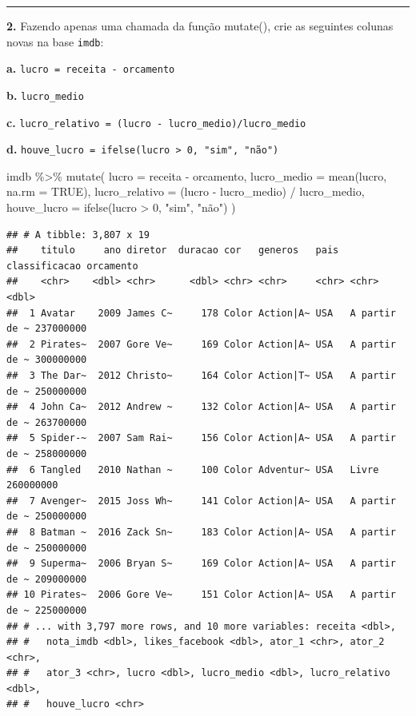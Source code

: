 \documentclass[
]{book}
\newenvironment{Shaded}{\begin{snugshade}}{\end{snugshade}}
\newcommand{\AttributeTok}[1]{\textcolor[rgb]{0.77,0.63,0.00}{#1}}
\newcommand{\ConstantTok}[1]{\textcolor[rgb]{0.00,0.00,0.00}{#1}}
\newcommand{\DecValTok}[1]{\textcolor[rgb]{0.00,0.00,0.81}{#1}}
\newcommand{\FunctionTok}[1]{\textcolor[rgb]{0.00,0.00,0.00}{#1}}
\newcommand{\NormalTok}[1]{#1}
\newcommand{\SpecialCharTok}[1]{\textcolor[rgb]{0.00,0.00,0.00}{#1}}
\newcommand{\StringTok}[1]{\textcolor[rgb]{0.31,0.60,0.02}{#1}}
\begin{document}
\begin{center}\rule{0.5\linewidth}{0.5pt}\end{center}

\textbf{2.} Fazendo apenas uma chamada da função mutate(), crie as seguintes colunas novas na base \texttt{imdb}:

\textbf{a.} \texttt{lucro\ =\ receita\ -\ orcamento}

\textbf{b.} \texttt{lucro\_medio}

\textbf{c.} \texttt{lucro\_relativo\ =\ (lucro\ -\ lucro\_medio)/lucro\_medio}

\textbf{d.} \texttt{houve\_lucro\ =\ ifelse(lucro\ \textgreater{}\ 0,\ "sim",\ "não")}

\begin{Shaded}
\begin{Highlighting}[]
\NormalTok{imdb }\SpecialCharTok{\%\textgreater{}\%} 
  \FunctionTok{mutate}\NormalTok{(}
    \AttributeTok{lucro =}\NormalTok{ receita }\SpecialCharTok{{-}}\NormalTok{ orcamento,}
    \AttributeTok{lucro\_medio =} \FunctionTok{mean}\NormalTok{(lucro, }\AttributeTok{na.rm =} \ConstantTok{TRUE}\NormalTok{),}
    \AttributeTok{lucro\_relativo =}\NormalTok{ (lucro }\SpecialCharTok{{-}}\NormalTok{ lucro\_medio) }\SpecialCharTok{/}\NormalTok{ lucro\_medio,}
    \AttributeTok{houve\_lucro =} \FunctionTok{ifelse}\NormalTok{(lucro }\SpecialCharTok{\textgreater{}} \DecValTok{0}\NormalTok{, }\StringTok{"sim"}\NormalTok{, }\StringTok{"não"}\NormalTok{)}
\NormalTok{  )}
\end{Highlighting}
\end{Shaded}

\begin{verbatim}
## # A tibble: 3,807 x 19
##    titulo     ano diretor  duracao cor   generos   pais  classificacao orcamento
##    <chr>    <dbl> <chr>      <dbl> <chr> <chr>     <chr> <chr>             <dbl>
##  1 Avatar    2009 James C~     178 Color Action|A~ USA   A partir de ~ 237000000
##  2 Pirates~  2007 Gore Ve~     169 Color Action|A~ USA   A partir de ~ 300000000
##  3 The Dar~  2012 Christo~     164 Color Action|T~ USA   A partir de ~ 250000000
##  4 John Ca~  2012 Andrew ~     132 Color Action|A~ USA   A partir de ~ 263700000
##  5 Spider-~  2007 Sam Rai~     156 Color Action|A~ USA   A partir de ~ 258000000
##  6 Tangled   2010 Nathan ~     100 Color Adventur~ USA   Livre         260000000
##  7 Avenger~  2015 Joss Wh~     141 Color Action|A~ USA   A partir de ~ 250000000
##  8 Batman ~  2016 Zack Sn~     183 Color Action|A~ USA   A partir de ~ 250000000
##  9 Superma~  2006 Bryan S~     169 Color Action|A~ USA   A partir de ~ 209000000
## 10 Pirates~  2006 Gore Ve~     151 Color Action|A~ USA   A partir de ~ 225000000
## # ... with 3,797 more rows, and 10 more variables: receita <dbl>,
## #   nota_imdb <dbl>, likes_facebook <dbl>, ator_1 <chr>, ator_2 <chr>,
## #   ator_3 <chr>, lucro <dbl>, lucro_medio <dbl>, lucro_relativo <dbl>,
## #   houve_lucro <chr>
\end{verbatim}
\end{document}
